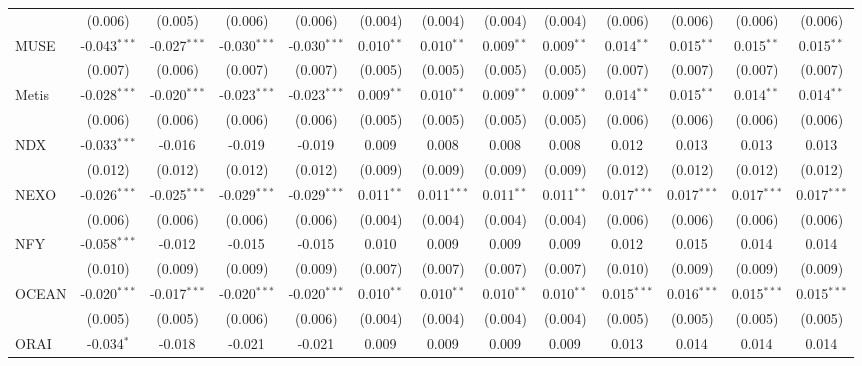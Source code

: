 \begin{table}[!htbp]
\begin{tabular}{@{\extracolsep{5pt}}lcccccccccccc}
  & (0.006) & (0.005) & (0.006) & (0.006) & (0.004) & (0.004) & (0.004) & (0.004) & (0.006) & (0.006) & (0.006) & (0.006) \\
 MUSE & -0.043$^{***}$ & -0.027$^{***}$ & -0.030$^{***}$ & -0.030$^{***}$ & 0.010$^{**}$ & 0.010$^{**}$ & 0.009$^{**}$ & 0.009$^{**}$ & 0.014$^{**}$ & 0.015$^{**}$ & 0.015$^{**}$ & 0.015$^{**}$ \\
  & (0.007) & (0.006) & (0.007) & (0.007) & (0.005) & (0.005) & (0.005) & (0.005) & (0.007) & (0.007) & (0.007) & (0.007) \\
 Metis & -0.028$^{***}$ & -0.020$^{***}$ & -0.023$^{***}$ & -0.023$^{***}$ & 0.009$^{**}$ & 0.010$^{**}$ & 0.009$^{**}$ & 0.009$^{**}$ & 0.014$^{**}$ & 0.015$^{**}$ & 0.014$^{**}$ & 0.014$^{**}$ \\
  & (0.006) & (0.006) & (0.006) & (0.006) & (0.005) & (0.005) & (0.005) & (0.005) & (0.006) & (0.006) & (0.006) & (0.006) \\
 NDX & -0.033$^{***}$ & -0.016$^{}$ & -0.019$^{}$ & -0.019$^{}$ & 0.009$^{}$ & 0.008$^{}$ & 0.008$^{}$ & 0.008$^{}$ & 0.012$^{}$ & 0.013$^{}$ & 0.013$^{}$ & 0.013$^{}$ \\
  & (0.012) & (0.012) & (0.012) & (0.012) & (0.009) & (0.009) & (0.009) & (0.009) & (0.012) & (0.012) & (0.012) & (0.012) \\
 NEXO & -0.026$^{***}$ & -0.025$^{***}$ & -0.029$^{***}$ & -0.029$^{***}$ & 0.011$^{**}$ & 0.011$^{***}$ & 0.011$^{**}$ & 0.011$^{**}$ & 0.017$^{***}$ & 0.017$^{***}$ & 0.017$^{***}$ & 0.017$^{***}$ \\
  & (0.006) & (0.006) & (0.006) & (0.006) & (0.004) & (0.004) & (0.004) & (0.004) & (0.006) & (0.006) & (0.006) & (0.006) \\
 NFY & -0.058$^{***}$ & -0.012$^{}$ & -0.015$^{}$ & -0.015$^{}$ & 0.010$^{}$ & 0.009$^{}$ & 0.009$^{}$ & 0.009$^{}$ & 0.012$^{}$ & 0.015$^{}$ & 0.014$^{}$ & 0.014$^{}$ \\
  & (0.010) & (0.009) & (0.009) & (0.009) & (0.007) & (0.007) & (0.007) & (0.007) & (0.010) & (0.009) & (0.009) & (0.009) \\
 OCEAN & -0.020$^{***}$ & -0.017$^{***}$ & -0.020$^{***}$ & -0.020$^{***}$ & 0.010$^{**}$ & 0.010$^{**}$ & 0.010$^{**}$ & 0.010$^{**}$ & 0.015$^{***}$ & 0.016$^{***}$ & 0.015$^{***}$ & 0.015$^{***}$ \\
  & (0.005) & (0.005) & (0.006) & (0.006) & (0.004) & (0.004) & (0.004) & (0.004) & (0.005) & (0.005) & (0.005) & (0.005) \\
 ORAI & -0.034$^{*}$ & -0.018$^{}$ & -0.021$^{}$ & -0.021$^{}$ & 0.009$^{}$ & 0.009$^{}$ & 0.009$^{}$ & 0.009$^{}$ & 0.013$^{}$ & 0.014$^{}$ & 0.014$^{}$ & 0.014$^{}$ \\

\end{tabular}
\end{table}
